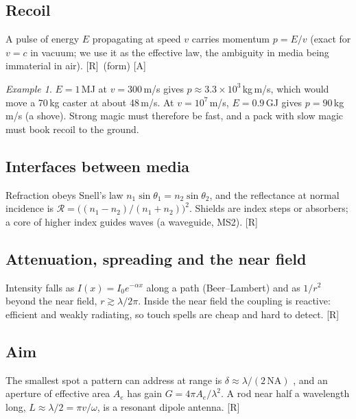 \documentclass[11pt,a4paper]{article}
\numberwithin{equation}{section}
\theoremstyle{definition}
\theoremstyle{plain}
\theoremstyle{remark}
\newtheorem{example}[definition]{Example}
\newcommand{\tagR}{\textcolor{tag}{\textsf{[R]}}}
\newcommand{\tagA}{\textcolor{tag}{\textsf{[A]}}}
\begin{document}
\subsection{Recoil}
A pulse of energy $E$ propagating at speed $v$ carries momentum $p=E/v$ (exact for $v=c$ in vacuum; we use it as the effective law, the ambiguity in media being immaterial in air). \tagR\ (form) \tagA
\begin{example}
$E=1$\,MJ at $v=300$\,m/s gives $p\approx3.3\times10^3$\,kg\,m/s, which would move a 70\,kg caster at about 48\,m/s. At $v=10^7$\,m/s, $E=0.9$\,GJ gives $p=90$\,kg\,m/s (a shove). Strong magic must therefore be fast, and a pack with slow magic must book recoil to the ground.
\end{example}

\subsection{Interfaces between media}
Refraction obeys Snell's law $n_1\sin\theta_1=n_2\sin\theta_2$, and the reflectance at normal incidence is $\mathcal R=\big((n_1-n_2)/(n_1+n_2)\big)^2$. Shields are index steps or absorbers; a core of higher index guides waves (a waveguide, MS2). \tagR

\subsection{Attenuation, spreading and the near field}
Intensity falls as $I(x)=I_0e^{-\alpha x}$ along a path (Beer--Lambert) and as $1/r^2$ beyond the near field, $r\gtrsim\lambda/2\pi$. Inside the near field the coupling is reactive: efficient and weakly radiating, so touch spells are cheap and hard to detect. \tagR

\subsection{Aim}
The smallest spot a pattern can address at range is $\delta\approx\lambda/(2\,\mathrm{NA})$ \cite{abbe}, and an aperture of effective area $A_e$ has gain $G=4\pi A_e/\lambda^2$. A rod near half a wavelength long, $L\approx\lambda/2=\pi v/\omega$, is a resonant dipole antenna. \tagR
\end{document}
